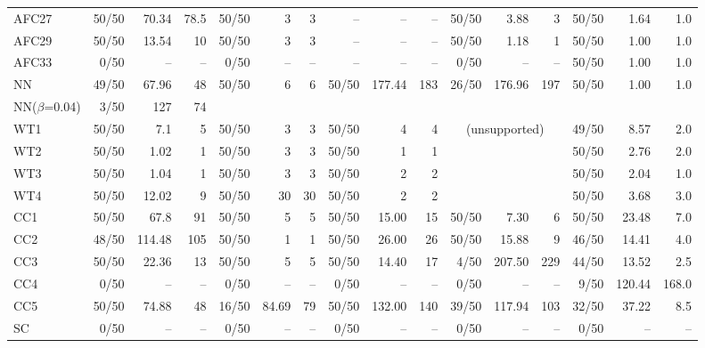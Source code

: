 \begin{table}
{\begin{tabular}{lrrrrrrrrrrrrrrr}
			\cmidrule(r){1-1} \cmidrule(lr){2-4} \cmidrule(lr){5-7} \cmidrule(lr){8-10} \cmidrule(lr){11-13} \cmidrule(lr){14-16}
			AFC27 & 50/50 & 70.34 & 78.5&50/50 &3&3& -- & -- & -- & 50/50 & 3.88 & 3 & 50/50 & 1.64 & 1.0 \\
			AFC29 & 50/50 & 13.54 & 10  &50/50 &3&3 & -- & -- & -- & 50/50 & 1.18 & 1 & 50/50 & 1.00 & 1.0\\
			AFC33 & 0/50 &--&--         & 0/50  & -- &-- & -- & -- & -- &  0/50 &   -- & -- & 50/50 & 1.00 & 1.0\\
			\cmidrule(r){1-1} \cmidrule(lr){2-4} \cmidrule(lr){5-7} \cmidrule(lr){8-10} \cmidrule(lr){11-13} \cmidrule(lr){14-16}
			NN & 49/50 & 67.96 & 48        &50/50&6&6& 50/50 & 177.44 & 183 & 26/50 & 176.96 & 197 & 50/50 & 1.00 & 1.0 \\
			NN($\beta$=0.04) & 3/50 & 127 & 74        &&&& & && & & & & &\\
			\cmidrule(r){1-1} \cmidrule(lr){2-4} \cmidrule(lr){5-7} \cmidrule(lr){8-10} \cmidrule(lr){11-13} \cmidrule(lr){14-16}
			WT1 & 50/50 & 7.1 & 5       &50/50 & 3 & 3& 50/50 & 4 & 4 & \multicolumn{3}{c}{(unsupported)} & 49/50 & 8.57  & 2.0 \\
			WT2 & 50/50 & 1.02 & 1      &50/50 & 3 & 3& 50/50 & 1 & 1 & & & & 50/50 & 2.76 & 2.0 \\
			WT3 &50/50 &1.04 &1         &50/50 & 3 & 3& 50/50 & 2 & 2 & & & & 50/50 & 2.04 & 1.0 \\
			WT4 &50/50 &12.02 &9        &50/50 & 30 & 30& 50/50 & 2 & 2 & & & & 50/50 & 3.68 & 3.0 \\
			\cmidrule(r){1-1} \cmidrule(lr){2-4} \cmidrule(lr){5-7} \cmidrule(lr){8-10} \cmidrule(lr){11-13} \cmidrule(lr){14-16}
			CC1 & 50/50 &67.8 &91       & 50/50 &  5    & 5 & 50/50 &  15.00 &  15 & 50/50 &   7.30 &   6 & 50/50 &  23.48 &   7.0 \\
			CC2  & 48/50 &114.48 &105          & 50/50 &  1    & 1 & 50/50 &  26.00 &  26 & 50/50 &  15.88 &   9 & 46/50 &  14.41 &   4.0 \\
			CC3  & 50/50 & 22.36 & 13   & 50/50 &  5    & 5 & 50/50 &  14.40 &  17 &  4/50 & 207.50 & 229 & 44/50 &  13.52 &   2.5 \\
			CC4 & 0/50 & --& --           & 0/50  &  --  & --&  0/50 &     -- &  -- &  0/50 &    --  &  -- &  9/50 & 120.44 & 168.0 \\
			CC5 & 50/50 & 74.88& 48     & 16/50 & 84.69 & 79& 50/50 & 132.00 & 140 & 39/50 & 117.94 & 103 & 32/50 &  37.22 &   8.5 \\
			\cmidrule(r){1-1} \cmidrule(lr){2-4} \cmidrule(lr){5-7} \cmidrule(lr){8-10} \cmidrule(lr){11-13} \cmidrule(lr){14-16}
			SC &0/50& -- & -- & 0/50 & -- & -- & 0/50 & -- & -- & 0/50 & -- & -- & 0/50 & -- & -- \\
			\bottomrule
	\end{tabular}}
\end{table}

